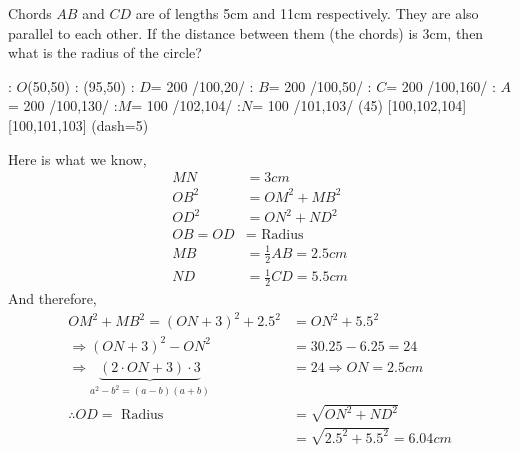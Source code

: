 

\question[3] Chords $AB$ and $CD$ are of lengths 5cm and 11cm respectively. They are also 
parallel to each other. If the distance between them (the chords) is 3cm, then what is 
the radius of the circle? 


  \begin{marginfigure}
      : $O$(50,50)
      : (95,50) %
      : $D$= 200 /100,20/
      : $B$= 200 /100,50/
      : $C$= 200 /100,160/
      : $A$= 200 /100,130/
      :$M$= 100 /102,104/
      :$N$= 100 /101,103/
    \figdrawbegin{}
      (45)
      \figdrawline [101,103]
      \figdrawline [102,104]
       [100,102,104]
       [100,101,103]
      \ifprintanswers
        \figset (dash=5)
        \figdrawline [100,101]
        \figdrawline [100,102]
      \fi
    \figdrawend
    \centerline{\box\figBoxA}
  \end{marginfigure}

\begin{solution}[\halfpage]
	Here is what we know,
	\begin{align}
		MN &= 3cm \\
		OB^2 &= OM^2 + MB^2 \\
		OD^2 &= ON^2 + ND^2 \\
		OB = OD &= \text{ Radius } \\
		MB &= \frac{1}{2}AB = 2.5cm \\
		ND &= \frac{1}{2}CD = 5.5cm
	\end{align}
	And therefore, 
	\begin{align}
		OM^2 + MB^2 = (ON + 3)^2 + 2.5^2 &= ON^2 + 5.5^2 \\
		\Rightarrow (ON+3)^2 - ON^2 &= 30.25 - 6.25 = 24 \\
		\Rightarrow \underbrace{(2\cdot ON + 3)\cdot 3}_{a^2-b^2 = (a-b)(a+b)} &= 24 \Rightarrow ON = 2.5cm \\
		\therefore OD = \text{ Radius } &= \sqrt{ON^2 + ND^2} \\ 
		&= \sqrt{2.5^2 + 5.5^2} = 6.04cm
	\end{align}
\end{solution}

